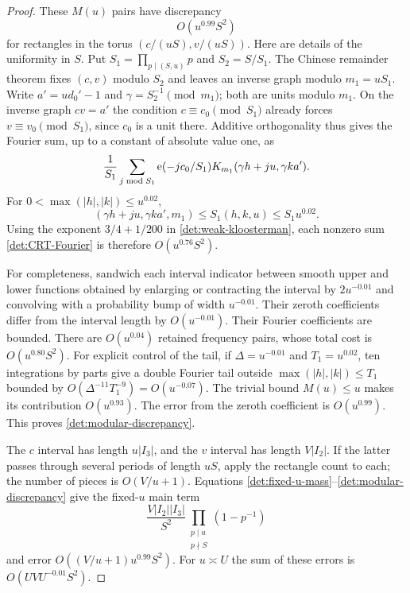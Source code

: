 \begin{proof}
These $M(u)$ pairs have discrepancy
\begin{equation}\label{det:modular-discrepancy}
 O(u^{0.99}S^2)
\end{equation}
for rectangles in the torus $(c/(uS),v/(uS))$.  Here are details
of the uniformity in $S$.  Put
$S_1=\prod_{p\mid(S,u)}p$ and $S_2=S/S_1$.  The Chinese
remainder theorem fixes $(c,v)$ modulo $S_2$ and leaves an
inverse graph modulo $m_1=uS_1$.  Write $a'=ud_0'-1$ and
$\gamma=S_2^{-1}\pmod {m_1}$; both are units modulo $m_1$.
On the inverse graph $cv=a'$ the condition $c\equiv c_0\pmod
{S_1}$ already forces $v\equiv v_0\pmod {S_1}$, since $c_0$
is a unit there.  Additive orthogonality thus gives the Fourier
sum, up to a constant of absolute value one, as
\begin{equation}\label{det:CRT-Fourier}
 \frac1{S_1}\sum_{j\bmod S_1}\mathrm{e}(-jc_0/S_1)
          K_{m_1}(\gamma h+ju,\gamma k a').
\end{equation}
For $0<\max(|h|,|k|)\leq u^{0.02}$,
\[
 (\gamma h+ju,\gamma ka',m_1)
      \leq S_1(h,k,u)\leq S_1u^{0.02}.
\]
Using the exponent $3/4+1/200$ in
\eqref{det:weak-kloosterman}, each nonzero sum
\eqref{det:CRT-Fourier} is therefore $O(u^{0.76}S^2)$.

For completeness, sandwich each interval indicator between
smooth upper and lower functions obtained by enlarging or
contracting the interval by $2u^{-0.01}$ and convolving with
a probability bump of width $u^{-0.01}$.  Their zeroth
coefficients differ from the interval length by $O(u^{-0.01})$.
Their Fourier coefficients are bounded.  There are $O(u^{0.04})$
retained frequency pairs, whose total cost is $O(u^{0.80}S^2)$.
For explicit control of the tail, if $\Delta=u^{-0.01}$ and
$T_1=u^{0.02}$, ten integrations by parts give a double
Fourier tail outside $\max(|h|,|k|)\leq T_1$ bounded by
$O(\Delta^{-11}T_1^{-9})=O(u^{-0.07})$.  The trivial bound
$M(u)\leq u$ makes its contribution $O(u^{0.93})$.
The error from the zeroth coefficient is $O(u^{0.99})$.
This proves \eqref{det:modular-discrepancy}.

The $c$ interval has length $u|I_3|$, and the $v$ interval has
length $V|I_2|$.  If the latter passes through several periods
of length $uS$, apply the rectangle count to each; the number
of pieces is $O(V/u+1)$.  Equations
\eqref{det:fixed-u-mass}--\eqref{det:modular-discrepancy} give
the fixed-$u$ main term
\[
 \frac{V|I_2||I_3|}{S^2}
           \prod_{\substack{p\mid u\\p\nmid S}}(1-p^{-1})
\]
and error $O((V/u+1)u^{0.99}S^2)$.
For $u\asymp U$ the sum of these errors is
$O(UV U^{-0.01}S^2)$.


\end{proof}
